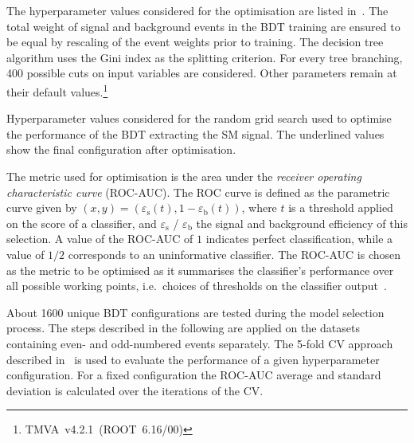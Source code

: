 The hyperparameter values considered for the optimisation are listed
in~. The total weight of signal and
background events in the BDT training are ensured to be equal by
rescaling of the event weights prior to training. The decision tree
algorithm uses the Gini index as the splitting criterion. For every
tree branching, 400 possible cuts on input variables are
considered. Other parameters remain at their default
values.\footnote{TMVA~v4.2.1~(ROOT~6.16/00)}

\begin{table}[htbp]
  \centering

  \caption{Hyperparameter values considered for the random grid search
    used to optimise the performance of the BDT extracting the SM \HH
    signal. The underlined values show the final configuration after
    optimisation.}%
  \label{tab:hyperparameter_grid_bdt}

  
\end{table}

The metric used for optimisation is the area under the \emph{receiver
  operating characteristic curve} (ROC-AUC). The ROC curve is defined
as the parametric curve given by
$(x, y) = \left( \varepsilon_{\text{s}}(t), 1 -
  \varepsilon_{\text{b}}(t) \right)$, where $t$ is a threshold applied
on the score of a classifier, and $\varepsilon_\text{s}$ /
$\varepsilon_\text{b}$ the signal and background efficiency of this
selection. A value of the ROC-AUC of $1$ indicates perfect
classification, while a value of $1/2$ corresponds to an uninformative
classifier. The ROC-AUC is chosen as the metric to be optimised as it
summarises the classifier's performance over all possible working
points, i.e.\ choices of thresholds on the classifier
output~\cite{james13}.

About 1600 unique BDT configurations are tested during the model
selection process. The steps described in the following are applied on
the datasets containing even- and odd-numbered events separately. The
5-fold CV approach described in~ is used
to evaluate the performance of a given hyperparameter
configuration. For a fixed configuration the ROC-AUC average and
standard deviation is calculated over the iterations of the CV.

